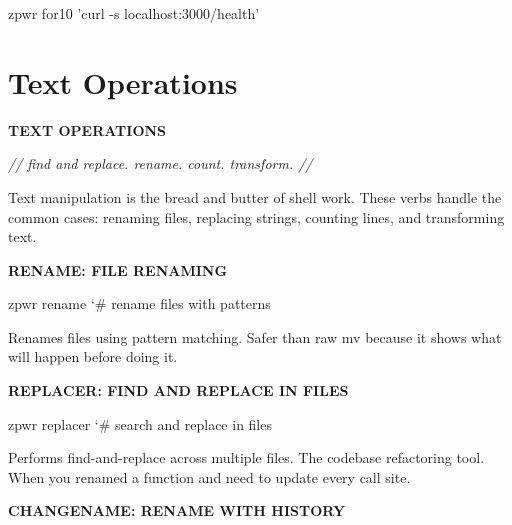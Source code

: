 \documentclass[11pt,a4paper,twoside]{book}
\begin{document}
\begin{codebox}
\color{neongreen}zpwr for10 'curl -s localhost:3000/health'\\
\end{codebox}


\vspace{16pt}

\section{Text Operations}


\vspace{10pt}
{\large\bfseries\color{neoncyan} TEXT OPERATIONS}\vspace{6pt}

{\small\itshape\color{dimtext} // find and replace. rename. count. transform. //}

Text manipulation is the bread and butter of shell work. These verbs handle the common cases: renaming files, replacing strings, counting lines, and transforming text.


\vspace{12pt}
{\bfseries\color{neonyellow} RENAME: FILE RENAMING}\vspace{4pt}

\begin{codebox}
\color{neongreen}zpwr rename                         {\char`\#} rename files with patterns\\
\end{codebox}

Renames files using pattern matching. Safer than raw mv because it shows what will happen before doing it.


\vspace{12pt}
{\bfseries\color{neonyellow} REPLACER: FIND AND REPLACE IN FILES}\vspace{4pt}

\begin{codebox}
\color{neongreen}zpwr replacer                       {\char`\#} search and replace in files\\
\end{codebox}

Performs find-and-replace across multiple files. The codebase refactoring tool. When you renamed a function and need to update every call site.


\vspace{12pt}
{\bfseries\color{neonyellow} CHANGENAME: RENAME WITH HISTORY}\vspace{4pt}
\end{document}
